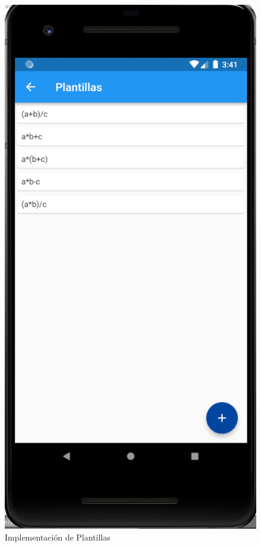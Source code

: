 \documentclass{article}
\begin{document}
\begin{figure}[H]
    \centering
    \includegraphics[scale=0.8]{imgs/Imp/Plantillas}
    \caption{Implementación de Plantillas}
\end{figure}
\end{document}
